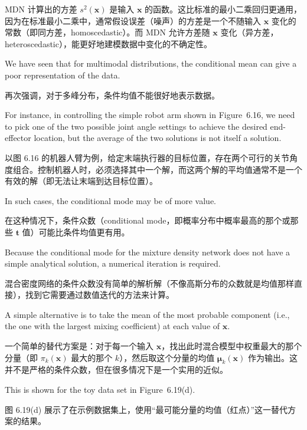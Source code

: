 \documentclass{article}
\begin{document}
{\color{red}
MDN 计算出的方差 $s^2(\mathbf{x})$ 是输入 $\mathbf{x}$ 的函数。这比标准的最小二乘回归更通用，因为在标准最小二乘中，通常假设误差（噪声）的方差是一个不随输入 $\mathbf{x}$ 变化的常数（即同方差，homoscedastic）。而 MDN 允许方差随 $\mathbf{x}$ 变化（异方差，heteroscedastic），能更好地建模数据中变化的不确定性。
}

We have seen that for multimodal distributions, the conditional mean can give a poor representation of the data. 

{\color{red}
再次强调，对于多峰分布，条件均值不能很好地表示数据。
}

For instance, in controlling the simple robot arm shown in Figure~6.16, we need to pick one of the two possible joint angle settings to achieve the desired end-effector location, but the average of the two solutions is not itself a solution. 

{\color{red}
以图 6.16 的机器人臂为例，给定末端执行器的目标位置，存在两个可行的关节角度组合。控制机器人时，必须选择其中一个解，而这两个解的平均值通常不是一个有效的解（即无法让末端到达目标位置）。
}

In such cases, the conditional mode may be of more value. 

{\color{red}
在这种情况下，条件众数（conditional mode，即概率分布中概率最高的那个或那些 $\mathbf{t}$ 值）可能比条件均值更有用。
}

Because the conditional mode for the mixture density network does not have a simple analytical solution, a numerical iteration is required. 

{\color{red}
混合密度网络的条件众数没有简单的解析解（不像高斯分布的众数就是均值那样直接），找到它需要通过数值迭代的方法来计算。
}

A simple alternative is to take the mean of the most probable component (i.e., the one with the largest mixing coefficient) at each value of $\mathbf{x}$. 

{\color{red}
一个简单的替代方案是：对于每一个输入 $\mathbf{x}$，找出此时混合模型中权重最大的那个分量（即 $\pi_k(\mathbf{x})$ 最大的那个 $k$），然后取这个分量的均值 $\boldsymbol{\mu}_k(\mathbf{x})$ 作为输出。这并不是严格的条件众数，但在很多情况下是一个实用的近似。
}

This is shown for the toy data set in Figure~6.19(d).

{\color{red}
图 6.19(d) 展示了在示例数据集上，使用“最可能分量的均值（红点）”这一替代方案的结果。
}

 
\end{document}
